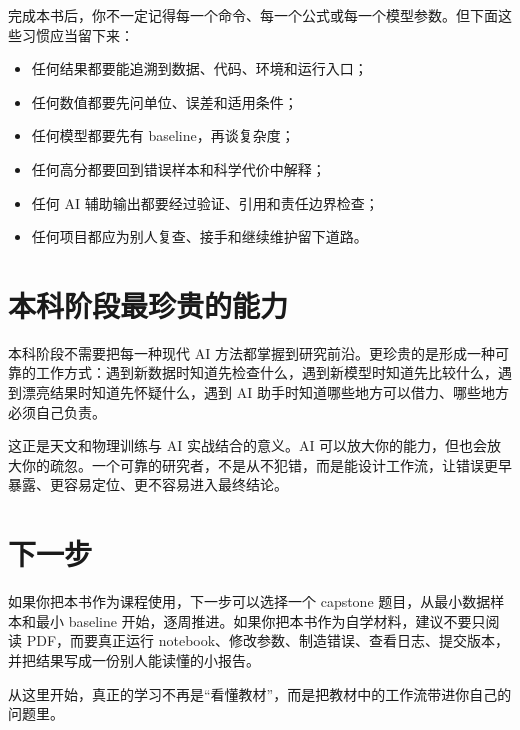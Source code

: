 完成本书后，你不一定记得每一个命令、每一个公式或每一个模型参数。但下面这些习惯应当留下来：

\begin{itemize}
    \item 任何结果都要能追溯到数据、代码、环境和运行入口；
    \item 任何数值都要先问单位、误差和适用条件；
    \item 任何模型都要先有 baseline，再谈复杂度；
    \item 任何高分都要回到错误样本和科学代价中解释；
    \item 任何 AI 辅助输出都要经过验证、引用和责任边界检查；
    \item 任何项目都应为别人复查、接手和继续维护留下道路。
\end{itemize}

\section*{本科阶段最珍贵的能力}

本科阶段不需要把每一种现代 AI 方法都掌握到研究前沿。更珍贵的是形成一种可靠的工作方式：遇到新数据时知道先检查什么，遇到新模型时知道先比较什么，遇到漂亮结果时知道先怀疑什么，遇到 AI 助手时知道哪些地方可以借力、哪些地方必须自己负责。

这正是天文和物理训练与 AI 实战结合的意义。AI 可以放大你的能力，但也会放大你的疏忽。一个可靠的研究者，不是从不犯错，而是能设计工作流，让错误更早暴露、更容易定位、更不容易进入最终结论。

\section*{下一步}

如果你把本书作为课程使用，下一步可以选择一个 capstone 题目，从最小数据样本和最小 baseline 开始，逐周推进。如果你把本书作为自学材料，建议不要只阅读 PDF，而要真正运行 notebook、修改参数、制造错误、查看日志、提交版本，并把结果写成一份别人能读懂的小报告。

从这里开始，真正的学习不再是“看懂教材”，而是把教材中的工作流带进你自己的问题里。

